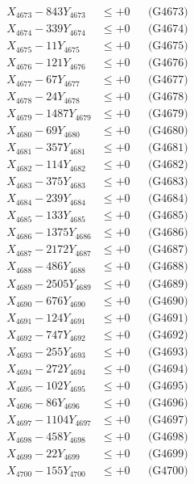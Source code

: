 \documentclass[a4paper,10pt]{article}
\begin{document}
{\begin{align}
X_{4673} - 843Y_{4673} &\leq +0 && \text{(G4673)} \\
X_{4674} - 339Y_{4674} &\leq +0 && \text{(G4674)} \\
X_{4675} - 11Y_{4675} &\leq +0 && \text{(G4675)} \\
X_{4676} - 121Y_{4676} &\leq +0 && \text{(G4676)} \\
X_{4677} - 67Y_{4677} &\leq +0 && \text{(G4677)} \\
X_{4678} - 24Y_{4678} &\leq +0 && \text{(G4678)} \\
X_{4679} - 1487Y_{4679} &\leq +0 && \text{(G4679)} \\
X_{4680} - 69Y_{4680} &\leq +0 && \text{(G4680)} \\
\allowbreak
X_{4681} - 357Y_{4681} &\leq +0 && \text{(G4681)} \\
X_{4682} - 114Y_{4682} &\leq +0 && \text{(G4682)} \\
X_{4683} - 375Y_{4683} &\leq +0 && \text{(G4683)} \\
X_{4684} - 239Y_{4684} &\leq +0 && \text{(G4684)} \\
X_{4685} - 133Y_{4685} &\leq +0 && \text{(G4685)} \\
X_{4686} - 1375Y_{4686} &\leq +0 && \text{(G4686)} \\
X_{4687} - 2172Y_{4687} &\leq +0 && \text{(G4687)} \\
X_{4688} - 486Y_{4688} &\leq +0 && \text{(G4688)} \\
X_{4689} - 2505Y_{4689} &\leq +0 && \text{(G4689)} \\
X_{4690} - 676Y_{4690} &\leq +0 && \text{(G4690)} \\
\allowbreak
X_{4691} - 124Y_{4691} &\leq +0 && \text{(G4691)} \\
X_{4692} - 747Y_{4692} &\leq +0 && \text{(G4692)} \\
X_{4693} - 255Y_{4693} &\leq +0 && \text{(G4693)} \\
X_{4694} - 272Y_{4694} &\leq +0 && \text{(G4694)} \\
X_{4695} - 102Y_{4695} &\leq +0 && \text{(G4695)} \\
X_{4696} - 86Y_{4696} &\leq +0 && \text{(G4696)} \\
X_{4697} - 1104Y_{4697} &\leq +0 && \text{(G4697)} \\
X_{4698} - 458Y_{4698} &\leq +0 && \text{(G4698)} \\
X_{4699} - 22Y_{4699} &\leq +0 && \text{(G4699)} \\
X_{4700} - 155Y_{4700} &\leq +0 && \text{(G4700)} \\

\end{align}}
\end{document}
